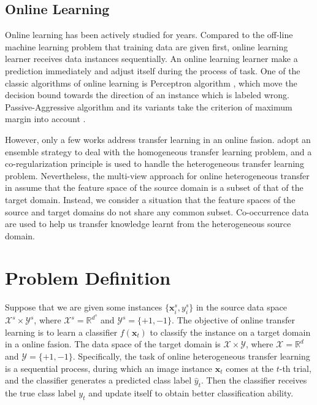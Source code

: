 \documentclass[letterpaper]{article}
\theoremstyle{remark}
\theoremstyle{definition}
\begin{document}
\subsection{Online Learning}

Online learning has been actively studied for years.
Compared to the off-line machine learning problem that training data are given first, online learning learner receives data instances sequentially.
An online learning learner make a prediction immediately and adjust itself during the process of task.
One of the classic algorithms of online learning is Perceptron algorithm \cite{rosenblatt1958perceptron}, which move the decision bound towards the direction of an instance which is labeled wrong.
Passive-Aggressive algorithm and its variants take the criterion of maximum margin into account \cite{crammer2006online}.

However, only a few works address transfer learning in an online fasion.
\cite{zhao2010otl,zhao2014online} adopt an ensemble strategy to deal with the homogeneous transfer learning problem, and a co-regularization principle is used to handle the heterogeneous transfer learning problem.
Nevertheless, the multi-view approach for online heterogeneous transfer in \cite{zhao2010otl,zhao2014online} assume that the feature space of the source domain is a subset of that of the target domain.
Instead, we consider a situation that the feature spaces of the source and target domains do not share any common subset.
Co-occurrence data are used to help us transfer knowledge learnt from the heterogeneous source domain.

\section{Problem Definition}

Suppose that we are given some instances $\{\mathbf{x}_{i}^{s}, y_{i}^{s}\}$ in the source data space $\mathcal{X}^{s} \times \mathcal{Y}^{s}$, where $\mathcal{X}^{s} = \mathbb{R}^{d^s}$ and $\mathcal{Y}^{s} = \{+1,-1\}$.
The objective of online transfer learning is to learn a classifier $f(\mathbf{x}_{t})$ to classify the instance on a target domain in a online fasion.
The data space of the target domain is $\mathcal{X} \times \mathcal{Y}$, where $\mathcal{X} = \mathbb{R}^{d}$ and $\mathcal{Y} = \{+1,-1\}$.
Specifically, the task of online heterogeneous transfer learning is a sequential process, during which an image instance $\mathbf{x}_t$ comes at the $t$-th trial, and the classifier generates a predicted class label $\hat{y}_{t}$.
Then the classifier receives the true class label $y_t$ and update itself to obtain better classification ability.
\end{document}
